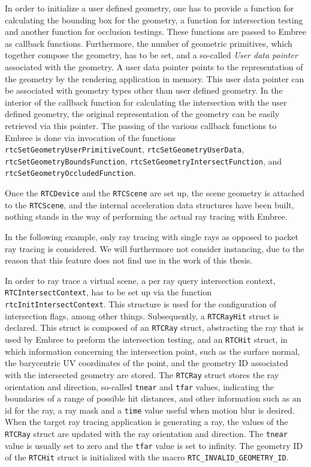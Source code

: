 In order to initialize a user defined geometry, one has to provide a function for calculating the bounding box for the geometry, a function for intersection testing and another function for occlusion testings. These functions are passed to Embree as callback functions. Furthermore, the number of geometric primitives, which together compose the geometry, has to be set, and a so-called \emph{User data pointer} associated with the geometry. A user data pointer points to the representation of the geometry by the rendering application in memory. This user data pointer can be associated with geometry types other than user defined geometry.
In the interior of the callback function for calculating the intersection with the user defined geometry, the original representation of the geometry can be easily retrieved via this pointer. The passing of the various callback functions to Embree is done via invocation of the functions \texttt{rtcSetGeometryUserPrimitiveCount}, \texttt{rtcSetGeometryUserData}, \texttt{rtcSetGeometryBoundsFunction}, \texttt{rtcSetGeometryIntersectFunction}, \newline and \texttt{rtcSetGeometryOccludedFunction}.

Once the \texttt{RTCDevice} and the \texttt{RTCScene} are set up, the scene geometry is attached to the \texttt{RTCScene}, and the internal acceleration data structures have been built, nothing stands in the way of performing the actual ray tracing with Embree. 

In the following example, only ray tracing with single rays as opposed to packet ray tracing is considered. We will furthermore not consider instancing, due to the reason that this feature does not find use in the work of this thesis.

In order to ray trace a virtual scene, a per ray query intersection context, \texttt{RTCIntersectContext}, has to be set up via the function \texttt{rtcInitIntersectContext}. This structure is used for the configuration of intersection flags, among other things. 
Subsequently, a \texttt{RTCRayHit} struct is declared. This struct is composed of an \texttt{RTCRay} struct, abstracting the ray that is used by Embree to preform the intersection testing, and an \texttt{RTCHit} struct, in which information concerning the intersection point, such as the surface normal, the barycentric UV coordinates of the point, and the geometry ID associated with the intersected geometry are stored.
The \texttt{RTCRay} struct stores the ray orientation and direction, so-called \texttt{tnear} and \texttt{tfar} values, indicating the boundaries of a range of possible hit distances, and other information such as an id for the ray, a ray mask and a \texttt{time} value useful when motion blur is desired.
When the target ray tracing application is generating a ray, the values of the \texttt{RTCRay} struct are updated with the ray orientation and direction. The \texttt{tnear} value is usually set to zero and the \texttt{tfar} value is set to infinity. The geometry ID of the \texttt{RTCHit} struct is initialized with the macro \texttt{RTC\_INVALID\_GEOMETRY\_ID}.

